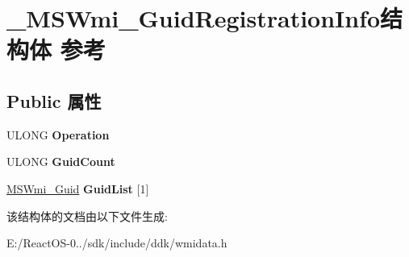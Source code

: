 \hypertarget{struct___m_s_wmi___guid_registration_info}{}\section{\+\_\+\+M\+S\+Wmi\+\_\+\+Guid\+Registration\+Info结构体 参考}
\label{struct___m_s_wmi___guid_registration_info}
\subsection*{Public 属性}
\begin{DoxyCompactItemize}
\item 
\mbox{\label{struct___m_s_wmi___guid_registration_info_a470725620ac7cc8e8220f9d22ad18a88}} 
U\+L\+O\+NG {\bfseries Operation}
\item 
\mbox{\label{struct___m_s_wmi___guid_registration_info_a15830df0c24d6998b924105df7f048d7}} 
U\+L\+O\+NG {\bfseries Guid\+Count}
\item 
\mbox{\label{struct___m_s_wmi___guid_registration_info_add59805e55aa8bf81111704cec29a2a2}} 
\hyperlink{struct___m_s_wmi___guid}{M\+S\+Wmi\+\_\+\+Guid} {\bfseries Guid\+List} \mbox{[}1\mbox{]}
\end{DoxyCompactItemize}


该结构体的文档由以下文件生成\+:\begin{DoxyCompactItemize}
\item 
E\+:/\+React\+O\+S-\/0../sdk/include/ddk/wmidata.\+h\end{DoxyCompactItemize}
